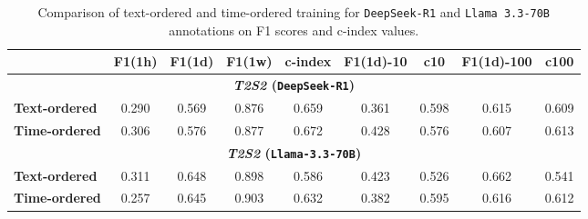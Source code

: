 \begin{table}[ht]
\centering
{
\begin{tabular}{lcccccccc}
\toprule
& F1(1h) & F1(1d) & F1(1w) & c-index & F1(1d)-10 & c10 & F1(1d)-100 & c100 \\
\hline
\multicolumn{9}{c}{\textbf{\textit{T2S2} (\texttt{DeepSeek-R1})}} \\
\hline
\textbf{Text-ordered} & 0.290 & 0.569 & 0.876 & 0.659 & 0.361 & 0.598 & 0.615 & 0.609 \\
\textbf{Time-ordered} & 0.306 & 0.576 & 0.877 & 0.672 & 0.428 & 0.576 & 0.607 & 0.613 \\
\hline
\multicolumn{9}{c}{\textbf{\textit{T2S2} (\texttt{Llama-3.3-70B})}} \\
\hline
\textbf{Text-ordered} & 0.311 & 0.648 & 0.898 & 0.586 & 0.423 & 0.526 & 0.662 & 0.541 \\
\textbf{Time-ordered} & 0.257 & 0.645 & 0.903 & 0.632 & 0.382 & 0.595 & 0.616 & 0.612 \\
\bottomrule
\end{tabular}
}
\caption{Comparison of text-ordered and time-ordered training for \texttt{DeepSeek-R1} and \texttt{Llama 3.3-70B} annotations on F1 scores and c-index values. 
}
\label{tab:dsr1q_l33_comparison}
\end{table}


%


    





